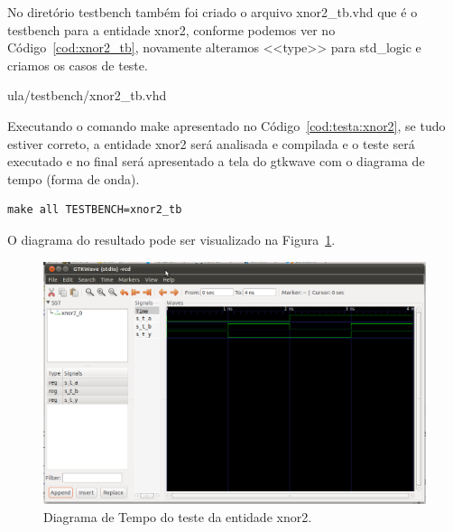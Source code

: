 \documentclass[a4paper,11pt]{report}
\begin{document}
\lstset{language=VHDL}
\lstset{numbers=left, numberstyle=\tiny, stepnumber=1, numbersep=3pt}


No diretório testbench também foi criado o arquivo xnor2\_tb.vhd que é o testbench para a entidade xnor2, conforme podemos ver no Código~\ref{cod:xnor2_tb}, novamente alteramos <<type>> para std\_logic e criamos os casos de teste.

\lstset{language=VHDL}
\lstset{numbers=left, numberstyle=\tiny, stepnumber=1, numbersep=3pt}
 {ula/testbench/xnor2_tb.vhd}

Executando o comando make apresentado no Código~\ref{cod:testa:xnor2}, se tudo estiver correto, a entidade xnor2 será analisada e compilada e o teste será executado e no final será apresentado a tela do gtkwave com o diagrama de tempo (forma de onda).

\lstset{numbers=left, numberstyle=\tiny, stepnumber=1, numbersep=3pt}
\begin{lstlisting}[label=cod:testa:xnor2,caption=Comando para executar o testbench da entidade xnor2.]
  make all TESTBENCH=xnor2_tb
\end{lstlisting}

O diagrama do resultado pode ser visualizado na Figura~\ref{fig:gtw:xnor2}.

\begin{figure}[H]
\centering
\includegraphics[width=1\textwidth]{figuras/gtw_xnor2.png}
\caption{Diagrama de Tempo do teste da entidade xnor2.}
\label{fig:gtw:xnor2}
\end{figure}
\end{document}
